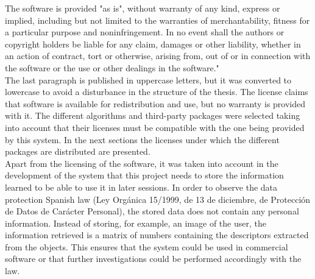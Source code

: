 The software is provided "as is", without warranty of any kind, express or implied, including but not limited to the warranties of merchantability, fitness for a particular purpose and noninfringement. In no event shall the authors or copyright holders be liable for any claim, damages or other liability, whether in an action of contract, tort or otherwise, arising from, out of or in connection with the software or the use or other dealings in the software."
\\

	The last paragraph is published in uppercase letters, but it was converted to lowercase to avoid a disturbance in the structure of the thesis. 	
	The license claims that software is available for redistribution and use, but no warranty is provided with it. 
	The different algorithms and third-party packages were selected taking into account that their licenses must be compatible with the one being provided by this system. 
	In the next sections the licenses under which the different packages are distributed are presented. 
	\\

	Apart from the licensing of the software, it was taken into account in the development of the system that this project needs to store the information learned to be able to use it in later sessions. %
	In order to observe the data protection Spanish law (Ley Orgánica 15/1999, de 13 de diciembre, de Protección de Datos de Carácter Personal), the stored data does not contain any personal information. 
	Instead of storing, for example, an image of the user, the information retrieved is a matrix of numbers containing the descriptors extracted from the objects. 
	This ensures that the system could be used in commercial software or that further investigations could be performed accordingly with the law. 





	\\

	

